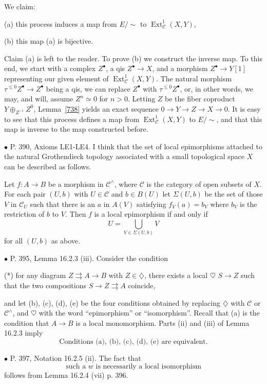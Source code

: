 \documentclass[12pt]{article}
\theoremstyle{remark}%
\newcommand{\bu}{\bullet}
\newcommand{\n}{\noindent}
\newcommand{\C}{\mathcal C}
\newcommand{\oo}{\operatorname}
\newcommand{\pa}{\rightrightarrows}
\newcommand{\be}{\begin{equation}}
\newcommand{\ee}{\end{equation}}
\begin{document}
We claim: 

(a) this process induces a map from $E/\!\!\sim$ to $\oo{Ext}^1_\C(X,Y)$, 

(b) this map (a) is bijective. 

Claim (a) is left to the reader. To prove (b) we construct the inverse map. To this end, we start with a complex $Z^\bullet$, a qis $Z^\bullet\to X$, and a morphism $Z^\bullet\to Y[1]$ representing our given element of $\oo{Ext}^1_\C(X,Y)$. The natural morphism $\tau^{\le0}Z^\bullet\to Z^\bullet$ being a qis, we can replace $Z^\bullet$ with $\tau^{\le0}Z^\bullet$, or, in other words, we may, and will, assume $Z^n\simeq0$ for $n>0$. Letting $Z$ be the fiber coproduct $Y\oplus_{Z^{-1}}Z^0$, Lemma~\ref{738} yields an exact sequence $0\to Y\to Z\to X\to0$. It is easy to see that this process defines a map from $\oo{Ext}^1_\C(X,Y)$ to $E/\!\!\sim$, and that this map is inverse to the map constructed before. 


\n$\bu$ P. 390, Axioms LE1-LE4. I think that the set of local epimorphisms attached to the natural Grothendieck topology associated with a small topological space $X$ can be described as follows. 

Let $f:A\to B$ be a morphism in $\C^\wedge$, where $\C$ is the category of open subsets of $X$. For each pair $(U,b)$ with $U\in\C$ and $b\in B(U)$ let $\Sigma(U,b)$ be the set of those $V$ in $\C_U$ such that there is an $a$ in $A(V)$ satisfying $f_V(a)=b_V$ where $b_V$ is the restriction of $b$ to $V$. Then $f$ is a local epimorphism if and only if 
$$
U=\bigcup_{V\in\Sigma(U,b)}V
$$ 
for all $(U,b)$ as above.


\n$\bu$ P. 395, Lemma 16.2.3 (iii). Consider the condition 

\n(*) for any diagram $Z\pa A\to B$ with $Z\in\diamondsuit$, there exists a local $\heartsuit$ $S\to Z$ such that the two compositions $S\to Z\pa A$ coincide, 

\n and let (b), (c), (d), (e) be the four conditions obtained by replacing $\diamondsuit$ with $\C$ or $\C^\wedge$, and $\heartsuit$ with the word ``epimorphism'' or ``isomorphism''. Recall that (a) is the condition that $A\to B$ is a local monomorphism. Parts (ii) and (iii) of Lemma 16.2.3 imply 
%
\be\label{1623}
\text{Conditions (a), (b), (c), (d), (e) are equivalent.}
\ee

\n$\bu$ P. 397, Notation 16.2.5 (ii). The fact that 
\be\label{1625}
\text{such a $w$ is necessarily a local isomorphism}
\ee
follows from Lemma 16.2.4 (vii) p. 396. 
\end{document}
